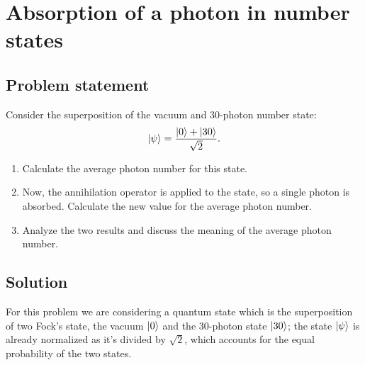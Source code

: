 \documentclass[prl, 11 pt]{revtex4-2}
\begin{document}

\newpage
\section{Absorption of a photon in number states}
\subsection{Problem statement}
Consider the superposition of the vacuum and 30-photon number state:
%
\begin{equation*}
    \ket{\psi} = \frac{\ket{0} + \ket{30}}{\sqrt{2}}.
\end{equation*}
%
\begin{enumerate}
    \item Calculate the average photon number for this state.
    \item Now, the annihilation operator is applied to the state, so a single photon is absorbed. Calculate the new value for the average photon number.
    \item Analyze the two results and discuss the meaning of the average photon number.
\end{enumerate}

\subsection{Solution}
For this problem we are considering a quantum state which is the superposition of two Fock's state, the vacuum $\ket{0}$ and the 30-photon state $\ket{30}$; the state $\ket{\psi}$ is already normalized as it's divided by $\sqrt{2}$, which accounts for the equal probability of the two states.
\end{document}

